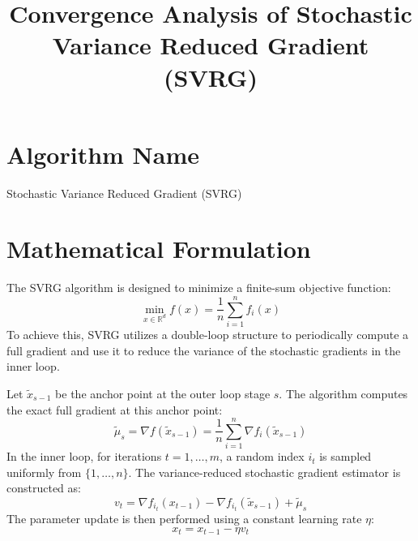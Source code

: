 \documentclass[11pt]{article}
\title{Convergence Analysis of Stochastic Variance Reduced Gradient (SVRG)}
\date{}
\begin{document}
\maketitle

\section*{Algorithm Name}
Stochastic Variance Reduced Gradient (SVRG)

\section*{Mathematical Formulation}
The SVRG algorithm is designed to minimize a finite-sum objective function:
\begin{equation}
    \min_{x \in \mathbb{R}^d} f(x) = \frac{1}{n} \sum_{i=1}^n f_i(x)
\end{equation}
To achieve this, SVRG utilizes a double-loop structure to periodically compute a full gradient and use it to reduce the variance of the stochastic gradients in the inner loop. 

Let $\tilde{x}_{s-1}$ be the anchor point at the outer loop stage $s$. The algorithm computes the exact full gradient at this anchor point:
\begin{equation}
    \tilde{\mu}_s = \nabla f(\tilde{x}_{s-1}) = \frac{1}{n} \sum_{i=1}^n \nabla f_i(\tilde{x}_{s-1})
\end{equation}
In the inner loop, for iterations $t = 1, \dots, m$, a random index $i_t$ is sampled uniformly from $\{1, \dots, n\}$. The variance-reduced stochastic gradient estimator is constructed as:
\begin{equation}
    v_t = \nabla f_{i_t}(x_{t-1}) - \nabla f_{i_t}(\tilde{x}_{s-1}) + \tilde{\mu}_s
\end{equation}
The parameter update is then performed using a constant learning rate $\eta$:
\begin{equation}
    x_t = x_{t-1} - \eta v_t
\end{equation}
\end{document}
